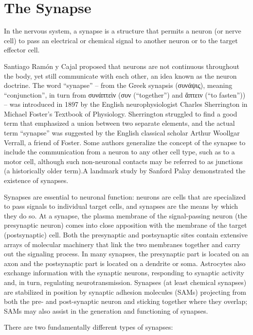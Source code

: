 \documentclass[]{book}
\begin{document}
\hypertarget{the-synapse}{%
\section{The Synapse}\label{the-synapse}}

In the nervous system, a synapse is a structure that permits a neuron (or nerve cell) to pass an electrical or chemical signal to another neuron or to the target effector cell.

Santiago Ramón y Cajal proposed that neurons are not continuous throughout the body, yet still communicate with each other, an idea known as the neuron doctrine. The word ``synapse'' -- from the Greek synapsis (συνάψις), meaning ``conjunction'', in turn from συνάπτεὶν (συν (``together'') and ἅπτειν (``to fasten'')) -- was introduced in 1897 by the English neurophysiologist Charles Sherrington in Michael Foster's Textbook of Physiology. Sherrington struggled to find a good term that emphasized a union between two separate elements, and the actual term ``synapse'' was suggested by the English classical scholar Arthur Woollgar Verrall, a friend of Foster. Some authors generalize the concept of the synapse to include the communication from a neuron to any other cell type, such as to a motor cell, although such non-neuronal contacts may be referred to as junctions (a historically older term).A landmark study by Sanford Palay demonstrated the existence of synapses.

Synapses are essential to neuronal function: neurons are cells that are specialized to pass signals to individual target cells, and synapses are the means by which they do so. At a synapse, the plasma membrane of the signal-passing neuron (the presynaptic neuron) comes into close apposition with the membrane of the target (postsynaptic) cell. Both the presynaptic and postsynaptic sites contain extensive arrays of molecular machinery that link the two membranes together and carry out the signaling process. In many synapses, the presynaptic part is located on an axon and the postsynaptic part is located on a dendrite or soma. Astrocytes also exchange information with the synaptic neurons, responding to synaptic activity and, in turn, regulating neurotransmission. Synapses (at least chemical synapses) are stabilized in position by synaptic adhesion molecules (SAMs) projecting from both the pre- and post-synaptic neuron and sticking together where they overlap; SAMs may also assist in the generation and functioning of synapses.

There are two fundamentally different types of synapses:
\end{document}
